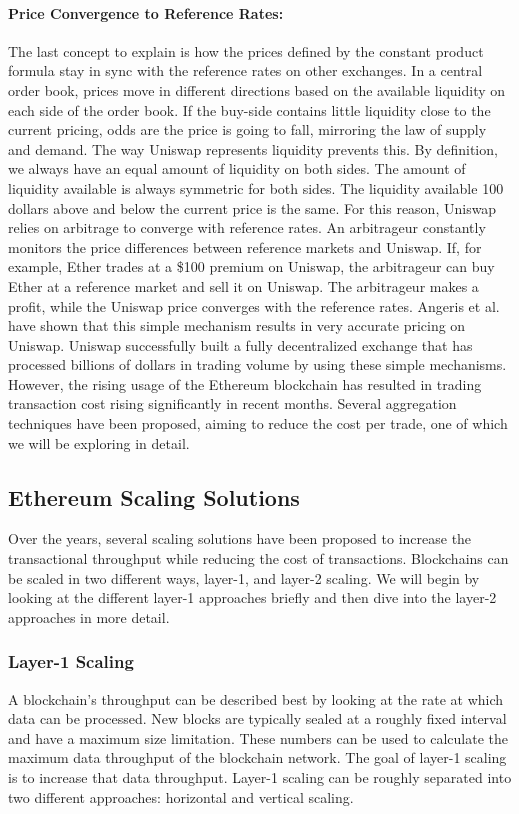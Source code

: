 \documentclass[../../thesis.tex]{subfiles}
\begin{document}
\paragraph{Price Convergence to Reference Rates:}
The last concept to explain is how the prices defined by the constant product formula stay in sync with the reference rates on other exchanges. In a central order book, prices move in different directions based on the available liquidity on each side of the order book. If the buy-side contains little liquidity close to the current pricing, odds are the price is going to fall, mirroring the law of supply and demand. The way Uniswap represents liquidity prevents this. By definition, we always have an equal amount of liquidity on both sides. The amount of liquidity available is always symmetric for both sides. The liquidity available 100 dollars above and below the current price is the same.
For this reason, Uniswap relies on arbitrage to converge with reference rates. An arbitrageur constantly monitors the price differences between reference markets and Uniswap. If, for example, Ether trades at a \$100 premium on Uniswap, the arbitrageur can buy Ether at a reference market and sell it on Uniswap. The arbitrageur makes a profit, while the Uniswap price converges with the reference rates. Angeris et al. \cite{angeris2019analysis} have shown that this simple mechanism results in very accurate pricing on Uniswap. Uniswap successfully built a fully decentralized exchange that has processed billions of dollars in trading volume by using these simple mechanisms. However, the rising usage of the Ethereum blockchain has resulted in trading transaction cost rising significantly in recent months. Several aggregation techniques have been proposed, aiming to reduce the cost per trade, one of which we will be exploring in detail. 

\subsection{Ethereum Scaling Solutions}
Over the years, several scaling solutions have been proposed to increase the transactional throughput while reducing the cost of transactions. Blockchains can be scaled in two different ways, layer-1, and layer-2 scaling. We will begin by looking at the different layer-1 approaches briefly and then dive into the layer-2 approaches in more detail. 

\subsubsection{Layer-1 Scaling}
A blockchain's throughput can be described best by looking at the rate at which data can be processed. New blocks are typically sealed at a roughly fixed interval and have a maximum size limitation. These numbers can be used to calculate the maximum data throughput of the blockchain network. The goal of layer-1 scaling is to increase that data throughput. Layer-1 scaling can be roughly separated into two different approaches: horizontal and vertical scaling.
\end{document}
